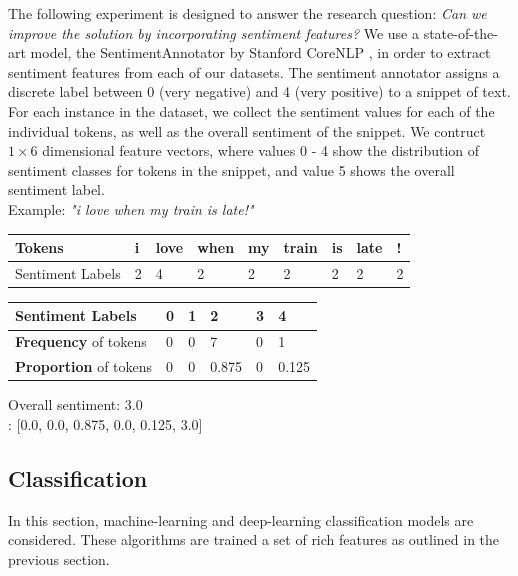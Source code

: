 \documentclass[12pt,a4paper]{article}
\begin{document}
\noindent The following experiment is designed to answer the research question: \textit{Can we improve the solution by incorporating sentiment features?} We use a state-of-the-art model, the SentimentAnnotator \cite{socher2013recursive} by Stanford CoreNLP \cite{manning2014stanford}, in order to extract sentiment features from each of our datasets. The sentiment annotator assigns a discrete label between 0 (very negative) and 4 (very positive) to a snippet of text. For each instance in the dataset, we collect the sentiment values for each of the individual tokens, as well as the overall sentiment of the snippet. We contruct $ 1 \times 6 $ dimensional feature vectors, where values 0 - 4 show the distribution of sentiment classes for tokens in the snippet, and value 5 shows the overall sentiment label.\\

\noindent Example: \textit{"i love when my train is late!"}\\

\begin{tabular}{|p{3cm}||p{0.2cm}p{1cm}p{1cm}p{1cm}p{1cm}p{0.8cm}p{1cm}p{1cm}|}
	\hline 
	Tokens & i & love & when & my & train & is & late & !\\ 
	\hline 
	Sentiment Labels & 2 & 4 & 2 & 2 & 2 & 2 & 2 & 2\\ 
	\hline 
\end{tabular}
\vspace{10pt}

\begin{tabular}{|p{3.8cm}||p{1cm}|p{1cm}|p{1cm}|p{1cm}|p{1cm}|} 
	\hline 
	Sentiment Labels & {0} & {1} & {2} & {3} & {4}\\ 
	\hline 
	\textbf{Frequency} of tokens & 0 & 0 & 7 & 0 & 1\\ 
	\textbf{Proportion} of tokens & 0 & 0 & 0.875 & 0 & 0.125\\
	\hline  
\end{tabular}
\vspace{10pt}

{Overall sentiment}: 3.0\\
: [0.0, 0.0, 0.875, 0.0, 0.125, 3.0]\\


\subsection{Classification}
\noindent 
In this section, machine-learning and deep-learning classification models are considered. These algorithms are trained a set of rich features as outlined in the previous section.
\end{document}

